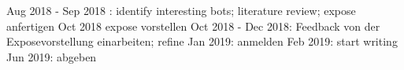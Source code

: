 \documentclass[pdftex,a4paper,11pt]{scrartcl}
\begin{document}
Aug 2018 - Sep 2018 : identify interesting bots; literature review; expose anfertigen
Oct 2018 expose vorstellen
Oct 2018 - Dec 2018: Feedback von der Exposevorstellung einarbeiten; refine
Jan 2019: anmelden
Feb 2019: start writing
Jun 2019: abgeben

\begin{comment}
\begin{itemize}
	\item Sie sollten bereits wissen, wann Sie fertig sein wollen und von dort mit der Rückwärtsterminierung starten.
	\item Ihre Arbeit ist ein Projekt, daher planen Sie es auch wie eines. Nutzen Sie zur Visualisierung ein Gantt-Chart.
\end{itemize}
\end{comment}

{}   %


\begin{comment}
\newpage
\section*{Anhang I: Auszug Prüfungsordnung Master}
\label{sec:master}

\begin{figure}[!h]
	\centering
		\texttt{[image: pics/Auszug\_Master\_Pruefungsordnung.pdf]}
	\caption{Auszug Prüfungsordnung Master}
\end{figure}
\end{comment}
\end{document}
